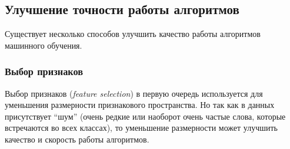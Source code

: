 \subsection{Улучшение точности работы алгоритмов}

Существует несколько способов улучшить качество работы алгоритмов машинного обучения.

\subsubsection{Выбор признаков}
Выбор признаков (\textit{feature selection}) в первую очередь используется для 
уменьшения размерности признакового пространства. Но так как в данных
присутствует ``шум'' (очень редкие или наоборот очень частые слова, которые
встречаются во всех классах), то уменьшение размерности может улучшить качество и скорость работы алгоритмов. 

